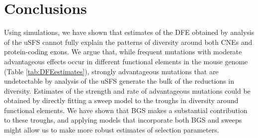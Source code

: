 \section{Conclusions}

	Using simulations, we have shown that estimates of the DFE obtained by analysis of the uSFS cannot fully explain the patterns of diversity around both CNEs and protein-coding exons. We argue that, while frequent mutations with moderate advantageous effects occur in different functional elements in the mouse genome (Table \ref{tab:DFEestimates}), strongly advantageous mutations that are undetectable by analysis of the uSFS generate the bulk of the reductions in diversity. Estimates of the strength and rate of advantageous mutations could be obtained by directly fitting a sweep model to the troughs in diversity around functional elements. We have shown that BGS makes a substantial contribution to these troughs, and applying models that incorporate both BGS and sweeps \citep{RN349,RN274,RN290} might allow us to make more robust estimates of selection parameters. 

